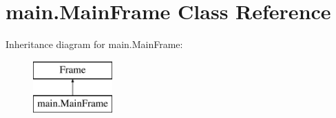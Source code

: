\hypertarget{classmain_1_1_main_frame}{\section{main.\+Main\+Frame Class Reference}
\label{classmain_1_1_main_frame}
}
Inheritance diagram for main.\+Main\+Frame\+:\begin{figure}[H]
\begin{center}
\leavevmode
\includegraphics[height=2.000000cm]{classmain_1_1_main_frame}
\end{center}
\end{figure}
